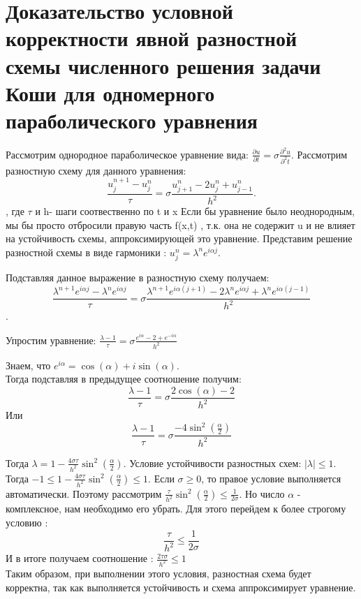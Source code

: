 \documentclass[__main__.tex]{subfiles}
\begin{document}
\section{Доказательство условной корректности явной разностной схемы численного решения задачи Коши для одномерного параболического уравнения}

Рассмотрим однородное параболическое уравнение вида: $\frac{\partial u}{\partial t}=\sigma \frac{\partial ^2 u}{\partial ^2 t}$. Рассмотрим разностную схему для данного уравнения: $$\frac{u^{n+1}_{j}-u^{n}_{j}}{\tau}=\sigma \frac{u^{n}_{j+1}-2u^{n}_{j}+u^{n}_{j-1}}{h^{2}}.$$, где $\tau$ и h- шаги соотвественно по t и x Если бы уравнение было неоднородным, мы бы просто отбросили правую часть f(x,t) , т.к. она не содержит u и не влияет на устойчивость схемы, аппроксимирующей это уравнение. Представим решение разностной схемы в виде гармоники : $u^{n}_{j}=\lambda ^n e^{i\alpha j}.$ 

Подставляя данное выражение в разностную схему получаем: $$\frac{\lambda ^{n+1} e^{i\alpha j}-\lambda ^n e^{i\alpha j}}{\tau}=\sigma \frac{\lambda ^{n+1} e^{i\alpha (j+1)}-2\lambda^n e^{i\alpha j}+ \lambda ^n e^{i \alpha (j-1)}}{h^2}$$. 

Упростим уравнение:
$\frac{\lambda-1}{\tau}=\sigma \frac{e^{i\alpha}-2+e^{-i\alpha}}{h^2}$

Знаем, что $e^{i\alpha}=\cos(\alpha)+i\sin(\alpha) $.\\
Тогда подставляя в предыдущее соотношение получим:
$$\frac{\lambda-1}{\tau}=\sigma \frac{2\cos(\alpha)-2}{h^2}$$
Или $$\frac{\lambda-1}{\tau}=\sigma \frac{-4\sin^2(\frac{\alpha}{2})}{h^2}$$

Тогда $\lambda=1-\frac{4\sigma\tau}{h^2}\sin^2(\frac{\alpha}{2})$. Условие устойчивости разностных схем: $|\lambda|\leq 1$. Тогда $-1\leq 1-\frac{4\sigma\tau}{h^2}\sin^2(\frac{\alpha}{2}) \leq 1$. Если $\sigma\geq 0$, то правое условие выполняется автоматически. Поэтому рассмотрим $\frac{\tau}{h^2}\sin^2(\frac{\alpha}{2})\leq \frac{1}{2\sigma}$. Но число $\alpha $ - комплексное, нам необходимо его убрать. Для этого перейдем к более строгому условию : $$\frac{\tau}{h^2}\leq\frac{1}{2\sigma}$$
И в итоге получаем соотношение : $ \frac{2\tau\sigma}{h^2}\leq 1 $ \\
Таким образом, при выполнении этого условия, разностная схема будет корректна, так как выполняется устойчивость и схема аппроксимирует уравнение.
\end{document}
